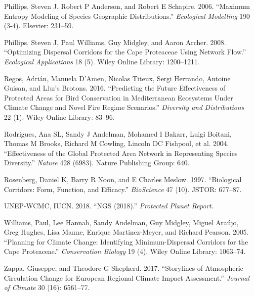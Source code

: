 \documentclass[]{article}
\begin{document}
\leavevmode\hypertarget{ref-phillips2006maximum}{}%
Phillips, Steven J, Robert P Anderson, and Robert E Schapire. 2006. ``Maximum Entropy Modeling of Species Geographic Distributions.'' \emph{Ecological Modelling} 190 (3-4). Elsevier: 231--59.

\leavevmode\hypertarget{ref-phillips2008optimizing}{}%
Phillips, Steven J, Paul Williams, Guy Midgley, and Aaron Archer. 2008. ``Optimizing Dispersal Corridors for the Cape Proteaceae Using Network Flow.'' \emph{Ecological Applications} 18 (5). Wiley Online Library: 1200--1211.

\leavevmode\hypertarget{ref-regos2016predicting}{}%
Regos, Adrián, Manuela D'Amen, Nicolas Titeux, Sergi Herrando, Antoine Guisan, and Lluı's Brotons. 2016. ``Predicting the Future Effectiveness of Protected Areas for Bird Conservation in Mediterranean Ecosystems Under Climate Change and Novel Fire Regime Scenarios.'' \emph{Diversity and Distributions} 22 (1). Wiley Online Library: 83--96.

\leavevmode\hypertarget{ref-rodrigues2004effectiveness}{}%
Rodrigues, Ana SL, Sandy J Andelman, Mohamed I Bakarr, Luigi Boitani, Thomas M Brooks, Richard M Cowling, Lincoln DC Fishpool, et al. 2004. ``Effectiveness of the Global Protected Area Network in Representing Species Diversity.'' \emph{Nature} 428 (6983). Nature Publishing Group: 640.

\leavevmode\hypertarget{ref-rosenberg1997biological}{}%
Rosenberg, Daniel K, Barry R Noon, and E Charles Meslow. 1997. ``Biological Corridors: Form, Function, and Efficacy.'' \emph{BioScience} 47 (10). JSTOR: 677--87.

\leavevmode\hypertarget{ref-unep2018ngs}{}%
UNEP-WCMC, IUCN. 2018. ``NGS (2018).'' \emph{Protected Planet Report}.

\leavevmode\hypertarget{ref-williams2005planning}{}%
Williams, Paul, Lee Hannah, Sandy Andelman, Guy Midgley, Miguel Araújo, Greg Hughes, Lisa Manne, Enrique Martinez-Meyer, and Richard Pearson. 2005. ``Planning for Climate Change: Identifying Minimum-Dispersal Corridors for the Cape Proteaceae.'' \emph{Conservation Biology} 19 (4). Wiley Online Library: 1063--74.

\leavevmode\hypertarget{ref-zappa2017storylines}{}%
Zappa, Giuseppe, and Theodore G Shepherd. 2017. ``Storylines of Atmospheric Circulation Change for European Regional Climate Impact Assessment.'' \emph{Journal of Climate} 30 (16): 6561--77.
\end{document}
